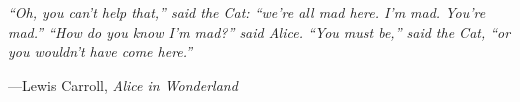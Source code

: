 \setlength{}
\setlength\epigraphrule{0pt}

\vspace*{\fill}
\epigraph{\justifying\itshape``Oh, you can't help that,'' said the Cat: ``we're all mad here. I'm mad. You're mad.'' ``How do you know I'm mad?'' said Alice. ``You must be,'' said the Cat, ``or you wouldn't have come here.''}{---Lewis Carroll, \textit{Alice in Wonderland}}